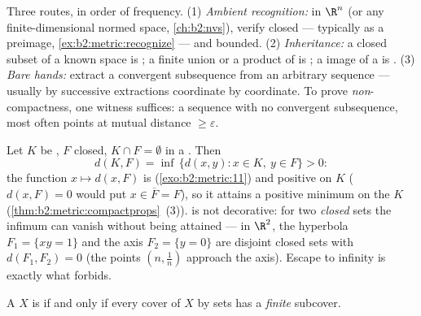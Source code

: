 \begin{method}\label{met:b2:metric:compactness}
Three routes, in order of frequency. (1) \emph{Ambient
recognition:} in $\R^n$ (or any finite-dimensional normed
space, \cref{ch:b2:nvs}), verify closed --- typically as a
preimage, \cref{ex:b2:metric:recognize} --- and bounded. (2)
\emph{Inheritance:} a closed subset of a known  space is
; a finite union or a product of  is ; a
 image of a  is . (3) \emph{Bare
hands:} extract a convergent subsequence from an arbitrary
sequence --- usually by successive extractions coordinate by
coordinate. To prove \emph{non}-compactness, one witness
suffices: a sequence with no convergent subsequence, most often
points at mutual distance $\geq \varepsilon$.
\end{method}

\begin{example}\label{ex:b2:metric:setdistance}
Let $K$ be , $F$ closed, $K \cap F = \emptyset$ in a
. Then
\[
d(K, F) = \inf\,\{d(x, y) : x \in K,\ y \in F\} > 0 :
\]
the function $x \mapsto d(x, F)$ is 
(\cref{exo:b2:metric:11}) and positive on $K$ ($d(x, F) = 0$
would put $x \in \overline F = F$), so it attains a positive
minimum on the  $K$
(\cref{thm:b2:metric:compactprops}~(3)).  is not
decorative: for two \emph{closed} sets the infimum can vanish
without being attained --- in $\R^2$, the hyperbola $F_1 = \{xy
= 1\}$ and the axis $F_2 = \{y = 0\}$ are disjoint closed sets
with $d(F_1, F_2) = 0$ (the points $(n, \frac1n)$ approach the
axis). Escape to infinity is exactly what  forbids.
\end{example}

\begin{theorem}\label{thm:b2:metric:borellebesgue}
A  $X$ is  if and only if every cover of $X$ by
 sets has a \emph{finite} subcover.
\end{theorem}

